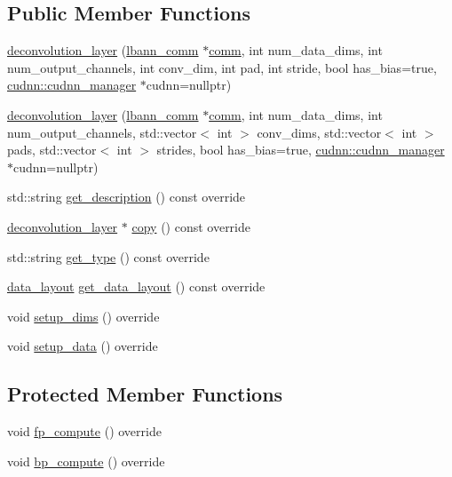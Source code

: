 \subsection*{Public Member Functions}
\begin{DoxyCompactItemize}
\item 
\hyperlink{classlbann_1_1deconvolution__layer_a95350e60a92634952c21b449ea14933d}{deconvolution\+\_\+layer} (\hyperlink{classlbann_1_1lbann__comm}{lbann\+\_\+comm} $\ast$\hyperlink{file__io_8cpp_ab048c6f9fcbcfaa57ce68b00263dbebe}{comm}, int num\+\_\+data\+\_\+dims, int num\+\_\+output\+\_\+channels, int conv\+\_\+dim, int pad, int stride, bool has\+\_\+bias=true, \hyperlink{classlbann_1_1cudnn_1_1cudnn__manager}{cudnn\+::cudnn\+\_\+manager} $\ast$cudnn=nullptr)
\item 
\hyperlink{classlbann_1_1deconvolution__layer_a8d9e59dbf6b8d8506fd1e59e0bcd4439}{deconvolution\+\_\+layer} (\hyperlink{classlbann_1_1lbann__comm}{lbann\+\_\+comm} $\ast$\hyperlink{file__io_8cpp_ab048c6f9fcbcfaa57ce68b00263dbebe}{comm}, int num\+\_\+data\+\_\+dims, int num\+\_\+output\+\_\+channels, std\+::vector$<$ int $>$ conv\+\_\+dims, std\+::vector$<$ int $>$ pads, std\+::vector$<$ int $>$ strides, bool has\+\_\+bias=true, \hyperlink{classlbann_1_1cudnn_1_1cudnn__manager}{cudnn\+::cudnn\+\_\+manager} $\ast$cudnn=nullptr)
\item 
std\+::string \hyperlink{classlbann_1_1deconvolution__layer_a07f211e08383fe8e26b6e1b916136b67}{get\+\_\+description} () const override
\item 
\hyperlink{classlbann_1_1deconvolution__layer}{deconvolution\+\_\+layer} $\ast$ \hyperlink{classlbann_1_1deconvolution__layer_aac6d10cbe30d5fcfed0a584321012b3a}{copy} () const override
\item 
std\+::string \hyperlink{classlbann_1_1deconvolution__layer_a8258c15978a081e3d3166a6a05579985}{get\+\_\+type} () const override
\item 
\hyperlink{base_8hpp_a786677cbfb3f5677b4d84f3056eb08db}{data\+\_\+layout} \hyperlink{classlbann_1_1deconvolution__layer_a43249c72b440db8b5a1a7f2735c6a118}{get\+\_\+data\+\_\+layout} () const override
\item 
void \hyperlink{classlbann_1_1deconvolution__layer_abec9b66f0659fd4f06a39a1e8c4bd06b}{setup\+\_\+dims} () override
\item 
void \hyperlink{classlbann_1_1deconvolution__layer_a6d891396ea1c91030cd647cc111c8c5f}{setup\+\_\+data} () override
\end{DoxyCompactItemize}
\subsection*{Protected Member Functions}
\begin{DoxyCompactItemize}
\item 
void \hyperlink{classlbann_1_1deconvolution__layer_a6ebbb96c605a96b41fdbbc848dcaa877}{fp\+\_\+compute} () override
\item 
void \hyperlink{classlbann_1_1deconvolution__layer_a70649662ff27ddacf0f5584829022b72}{bp\+\_\+compute} () override
\end{DoxyCompactItemize}
